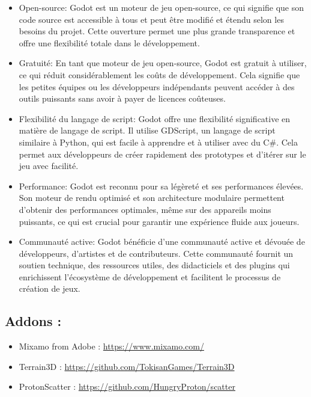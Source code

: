 \documentclass[
	article,			%
	11pt,				%
	oneside,			%
	a4paper,			%
	chapter=TITLE,
	french,			%
	sumario=tradicional
	]{base_nt}
\begin{document}
\begin{itemize}
    \item Open-source: Godot est un moteur de jeu open-source, ce qui signifie que son code source est accessible à tous et peut être modifié et étendu selon les besoins du projet. Cette ouverture permet une plus grande transparence et offre une flexibilité totale dans le développement.
    \item Gratuité: En tant que moteur de jeu open-source, Godot est gratuit à utiliser, ce qui réduit considérablement les coûts de développement. Cela signifie que les petites équipes ou les développeurs indépendants peuvent accéder à des outils puissants sans avoir à payer de licences coûteuses.
    \item Flexibilité du langage de script: Godot offre une flexibilité significative en matière de langage de script. Il utilise GDScript, un langage de script similaire à Python, qui est facile à apprendre et à utiliser avec du C\#. Cela permet aux développeurs de créer rapidement des prototypes et d'itérer sur le jeu avec facilité.
    \item Performance: Godot est reconnu pour sa légèreté et ses performances élevées. Son moteur de rendu optimisé et son architecture modulaire permettent d'obtenir des performances optimales, même sur des appareils moins puissants, ce qui est crucial pour garantir une expérience fluide aux joueurs.
    \item Communauté active: Godot bénéficie d'une communauté active et dévouée de développeurs, d'artistes et de contributeurs. Cette communauté fournit un soutien technique, des ressources utiles, des didacticiels et des plugins qui enrichissent l'écosystème de développement et facilitent le processus de création de jeux.
\end{itemize}

\subsection{Addons :}

\begin{itemize}
    \item Mixamo from Adobe :  \url{https://www.mixamo.com/}
    \item Terrain3D :  \url{https://github.com/TokisanGames/Terrain3D}
    \item ProtonScatter :  \url{ https://github.com/HungryProton/scatter}
\end{itemize}
\end{document}
